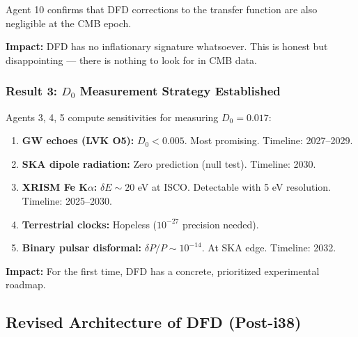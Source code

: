 \documentclass[11pt,a4paper]{article}
\begin{document}
Agent 10 confirms that DFD corrections to the transfer function are also negligible at the CMB epoch.

\textbf{Impact:} DFD has no inflationary signature whatsoever. This is honest but disappointing --- there is nothing to look for in CMB data.

\subsubsection{Result 3: $D_0$ Measurement Strategy Established}

Agents 3, 4, 5 compute sensitivities for measuring $D_0 = 0.017$:
\begin{enumerate}
\item \textbf{GW echoes (LVK O5):} $D_0 < 0.005$. Most promising. Timeline: 2027--2029.
\item \textbf{SKA dipole radiation:} Zero prediction (null test). Timeline: 2030.
\item \textbf{XRISM Fe K$\alpha$:} $\delta E \sim 20$ eV at ISCO. Detectable with 5 eV resolution. Timeline: 2025--2030.
\item \textbf{Terrestrial clocks:} Hopeless ($10^{-27}$ precision needed).
\item \textbf{Binary pulsar disformal:} $\delta P/P \sim 10^{-14}$. At SKA edge. Timeline: 2032.
\end{enumerate}

\textbf{Impact:} For the first time, DFD has a concrete, prioritized experimental roadmap.

\subsection{Revised Architecture of DFD (Post-i38)}

\begin{center}
\end{center}
\end{document}
